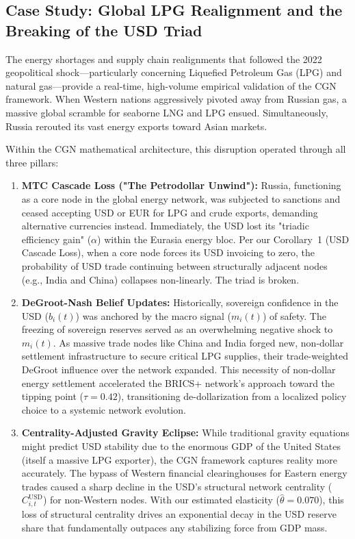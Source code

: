 \documentclass[12pt, letterpaper]{article}
\theoremstyle{definition}
\begin{document}
\subsection{Case Study: Global LPG Realignment and the Breaking of the USD Triad}

The energy shortages and supply chain realignments that followed the 2022 geopolitical shock---particularly concerning Liquefied Petroleum Gas (LPG) and natural gas---provide a real-time, high-volume empirical validation of the CGN framework. When Western nations aggressively pivoted away from Russian gas, a massive global scramble for seaborne LNG and LPG ensued. Simultaneously, Russia rerouted its vast energy exports toward Asian markets.

Within the CGN mathematical architecture, this disruption operated through all three pillars:

\begin{enumerate}
    \item \textbf{MTC Cascade Loss ("The Petrodollar Unwind"):} Russia, functioning as a core node in the global energy network, was subjected to sanctions and ceased accepting USD or EUR for LPG and crude exports, demanding alternative currencies instead. Immediately, the USD lost its "triadic efficiency gain" ($\alpha$) within the Eurasia energy bloc. Per our Corollary~1 (USD Cascade Loss), when a core node forces its USD invoicing to zero, the probability of USD trade continuing between structurally adjacent nodes (e.g., India and China) collapses non-linearly. The triad is broken.
    \item \textbf{DeGroot-Nash Belief Updates:} Historically, sovereign confidence in the USD ($b_i(t)$) was anchored by the macro signal ($m_i(t)$) of safety. The freezing of sovereign reserves served as an overwhelming negative shock to $m_i(t)$. As massive trade nodes like China and India forged new, non-dollar settlement infrastructure to secure critical LPG supplies, their trade-weighted DeGroot influence over the network expanded. This necessity of non-dollar energy settlement accelerated the BRICS+ network's approach toward the tipping point ($\tau = 0.42$), transitioning de-dollarization from a localized policy choice to a systemic network evolution.
    \item \textbf{Centrality-Adjusted Gravity Eclipse:} While traditional gravity equations might predict USD stability due to the enormous GDP of the United States (itself a massive LPG exporter), the CGN framework captures reality more accurately. The bypass of Western financial clearinghouses for Eastern energy trades caused a sharp decline in the USD's structural network centrality ($C_{i,t}^{\text{USD}}$) for non-Western nodes. With our estimated elasticity ($\hat\theta = 0.070$), this loss of structural centrality drives an exponential decay in the USD reserve share that fundamentally outpaces any stabilizing force from GDP mass.
\end{enumerate}
\end{document}
